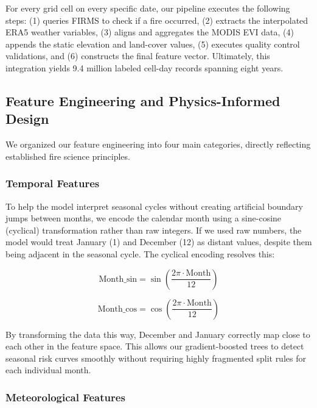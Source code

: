 \documentclass[11pt]{article}
\begin{document}
For every grid cell on every specific date, our pipeline executes the following steps: (1) queries FIRMS to check if a fire occurred, (2) extracts the interpolated ERA5 weather variables, (3) aligns and aggregates the MODIS EVI data, (4) appends the static elevation and land-cover values, (5) executes quality control validations, and (6) constructs the final feature vector. Ultimately, this integration yields 9.4 million labeled cell-day records spanning eight years.

\subsection{Feature Engineering and Physics-Informed Design}

We organized our feature engineering into four main categories, directly reflecting established fire science principles.

\subsubsection{Temporal Features}

To help the model interpret seasonal cycles without creating artificial boundary jumps between months, we encode the calendar month using a sine-cosine (cyclical) transformation rather than raw integers. If we used raw numbers, the model would treat January (1) and December (12) as distant values, despite them being adjacent in the seasonal cycle. The cyclical encoding resolves this:

\begin{equation}
\text{Month\_sin} = \sin\left(\frac{2\pi \cdot \text{Month}}{12}\right)
\end{equation}

\begin{equation}
\text{Month\_cos} = \cos\left(\frac{2\pi \cdot \text{Month}}{12}\right)
\end{equation}

By transforming the data this way, December and January correctly map close to each other in the feature space. This allows our gradient-boosted trees to detect seasonal risk curves smoothly without requiring highly fragmented split rules for each individual month.

\subsubsection{Meteorological Features}
\end{document}
